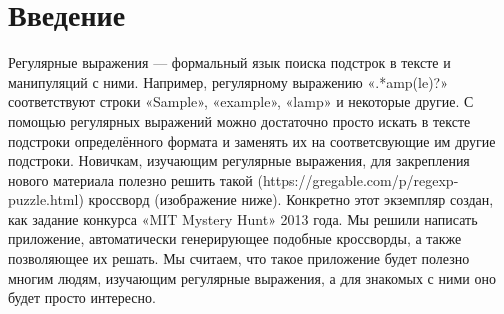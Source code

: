 \documentclass[12pt]{article}
\begin{document}
    \part*{Введение}
Регулярные выражения — формальный язык поиска подстрок в тексте и манипуляций с ними. Например, регулярному выражению «.*amp(le)?» соответствуют строки «Sample», «example», «lamp» и некоторые другие. С помощью регулярных выражений можно достаточно просто искать в тексте подстроки определённого формата и заменять их на соответсвующие им другие подстроки. Новичкам, изучающим регулярные выражения, для закрепления нового материала полезно решить такой (https://gregable.com/p/regexp-puzzle.html) кроссворд (изображение ниже). Конкретно этот экземпляр создан, как задание конкурса «MIT Mystery Hunt» 2013 года. Мы решили написать приложение, автоматически генерирующее подобные кроссворды, а также позволяющее их решать. Мы считаем, что такое приложение будет полезно многим людям, изучающим регулярные выражения, а для знакомых с ними оно будет просто интересно.

    \newpage %

    \newpage %
\end{document}
